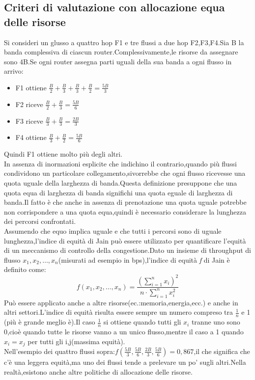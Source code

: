 \subsection{Criteri di valutazione con allocazione equa delle risorse}
Si consideri un glusso a quattro hop F1 e tre flussi a due hop F2,F3,F4.Sia B la banda complessiva di ciascun router.Complessivamente,le risorse da assegnare sono 4B.Se ogni router assegna parti uguali della sua banda a ogni flusso in arrivo:
\begin{itemize}
  \item F1 ottiene $\frac{B}{2} + \frac{B}{3} + \frac{B}{3} + \frac{B}{2} = \frac{5B}{3} $
  \item F2 riceve $\frac{B}{2} + \frac{B}{3} = \frac{5B}{6} $
  \item F3 riceve $\frac{B}{3} + \frac{B}{3} = \frac{2B}{3} $
  \item F4 ottiene $\frac{B}{3} + \frac{B}{2} = \frac{5B}{6} $
\end{itemize}
Quindi F1 ottiene molto più degli altri.\\
In assenza di inormazioni esplicite che indichino il contrario,quando più flussi condividono un particolare collegamento,sivorrebbe che ogni flusso ricevesse una quota uguale della larghezza di banda.Questa definizione presuppone che una quota equa di larghezza di banda significhi una quota eguale di larghezza di banda.Il fatto è che anche in assenza di prenotazione una quota uguale potrebbe non corrispondere a una quota equa,quindi è necessario considerare la lunghezza dei percorsi confrontati.\\
Assumendo che equo implica uguale e che tutti i percorsi sono di uguale lunghezza,l'indice di equità di Jain può essere utilizzato per quantificare l'equità di un meccanismo di controllo della congestione.Dato un insieme di throughput di flusso $x_1,x_2,\ldots,x_n$(misurati ad esempio in bps),l'indice di equità \textit{f} di Jain è definito come:
\begin{equation}
  f(x_1, x_2, \ldots, x_n) = \frac{\left(\sum_{i=1}^{n} x_i\right)^2}{n \cdot \sum_{i=1}^{n} x_i^2}
\end{equation}
Può essere applicato anche a altre risorse(ec.:memoria,energia,ecc.) e anche in altri settori.L'indice di equità risulta essere sempre un numero compreso tra $\frac{1}{n}$ e 1 (più è grande meglio è).Il caso $\frac{1}{n}$ si ottiene quando tutti gli $x_i$ tranne uno sono 0,cioè quando tutte le risorse vanno a un unico flusso,mentre il caso a 1 quando $x_i=x_j$ per tutti gli i,j(massima equità).\\
Nell'esempio dei quattro flussi sopra:$f(\frac{5B}{3},\frac{5B}{6},\frac{2B}{3},\frac{5B}{6}) = 0,867$,il che significa che c'è una leggera equità,ma uno dei flussi tende a prelevare un po' sugli altri.Nella realtà,esistono anche altre politiche di allocazione delle risorse.
